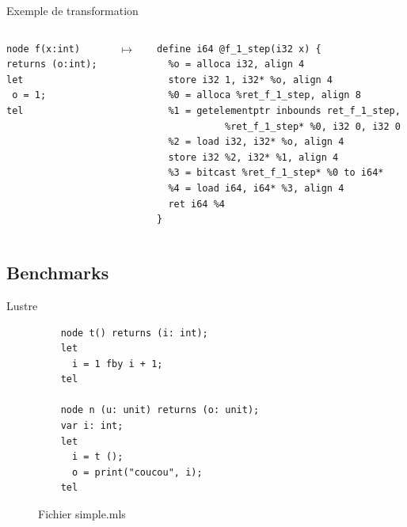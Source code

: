 \documentclass{beamer} %
\begin{document}
\begin{frame}[fragile]{Exemple de transformation}
    \begin{columns}
    \begin{column}{0.25\textwidth}
  \begin{verbatim}
node f(x:int)
returns (o:int);
let
 o = 1;
tel
   \end{verbatim}
    \end{column}
    \begin{column}{0.05\textwidth}
        $\mapsto$
    \end{column}
    \begin{column}{0.70\textwidth}  %
  \begin{verbatim}
define i64 @f_1_step(i32 x) {
  %o = alloca i32, align 4
  store i32 1, i32* %o, align 4
  %0 = alloca %ret_f_1_step, align 8
  %1 = getelementptr inbounds ret_f_1_step,
            %ret_f_1_step* %0, i32 0, i32 0
  %2 = load i32, i32* %o, align 4
  store i32 %2, i32* %1, align 4
  %3 = bitcast %ret_f_1_step* %0 to i64*
  %4 = load i64, i64* %3, align 4
  ret i64 %4
}
   \end{verbatim}
    \end{column}
    \end{columns}
\end{frame}

\subsection{Benchmarks}

\begin{frame}[fragile]{Lustre}
    \begin{figure}
        \begin{verbatim}
    node t() returns (i: int);
    let
      i = 1 fby i + 1;
    tel

    node n (u: unit) returns (o: unit);
    var i: int;
    let
      i = t ();
      o = print("coucou", i);
    tel
        \end{verbatim}
        \caption{Fichier simple.mls}
    \end{figure}

\end{frame}
\end{document}
